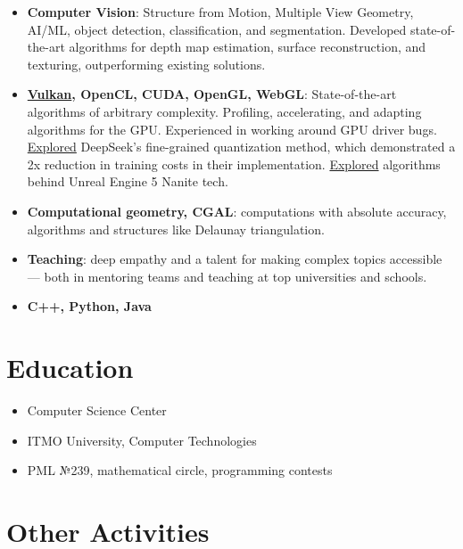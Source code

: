 \documentclass[11pt,oneside]{article}
\newcommand{\hhref}[2]{\href{#1}{\color{blue}#2}}
\begin{document}
\begin{itemize}
    \item{\textbf{Computer Vision}}: Structure from Motion, Multiple View Geometry, AI/ML, object detection, classification, and segmentation. Developed state-of-the-art algorithms for depth map estimation, surface reconstruction, and texturing, outperforming existing solutions.

    \item{\textbf{\hhref{https://github.com/GPGPUCourse/GPGPUVulkan}{Vulkan}, OpenCL, CUDA, OpenGL, WebGL}}: State-of-the-art algorithms of arbitrary complexity. Profiling, accelerating, and adapting algorithms for the GPU. Experienced in working around GPU driver bugs. \hhref{https://youtu.be/zJ6ru8dNAcs?t=5698}{Explored} DeepSeek’s fine-grained quantization method, which demonstrated a 2x reduction in training costs in their implementation. \hhref{https://www.youtube.com/watch?v=ltUzX1IR9JI&list=PL5p-5hHpsHBolSeDn7__1c9hgPprYTjnn&index=3}{Explored} algorithms behind Unreal Engine 5 Nanite tech.

    \item{\textbf{Computational geometry, CGAL}}: computations with absolute accuracy, algorithms and structures like Delaunay triangulation.

    \item{\textbf{Teaching}}: deep empathy and a talent for making complex topics accessible — both in mentoring teams and teaching at top universities and schools.

    \item{\textbf{C++, Python, Java}}
\end{itemize}

\vspace{-9pt}
\section*{\textbf{Education}}
\vspace{-9pt}

\begin{itemize}
    \item{Computer Science Center}
    \item{ITMO University, Computer Technologies}
    \item{PML №239, mathematical circle, programming contests}
\end{itemize}


\vspace{-9pt}
\section*{\textbf{Other Activities}}
\vspace{-9pt}
\end{document}
